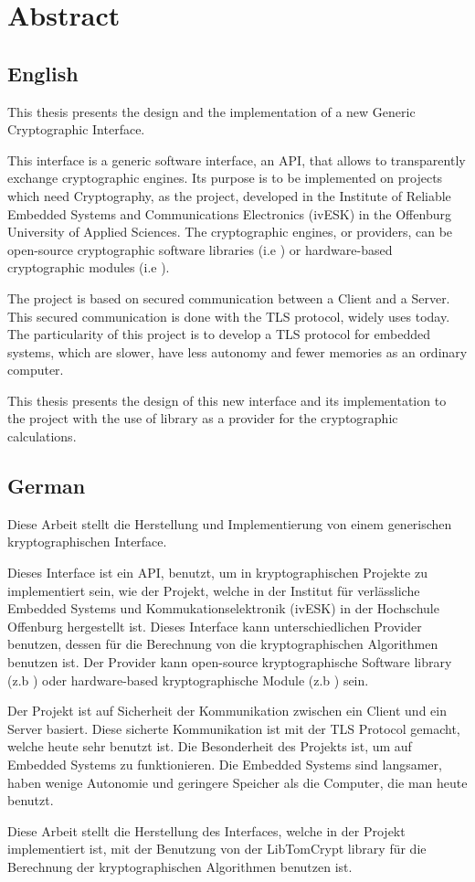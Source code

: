 \chapter*{Abstract}

\section*{English}

This thesis presents the design and the implementation of a new Generic
Cryptographic Interface.

This interface is a generic software interface, an API, that allows
to transparently exchange cryptographic engines. Its purpose is to be
implemented on projects which need Cryptography, as the \embtls project,
developed in the Institute of Reliable Embedded Systems and Communications
Electronics (ivESK) in the Offenburg University of Applied Sciences.
The cryptographic engines, or providers, can be open-source cryptographic
software libraries (i.e \tomcrypt \cite{doc:tomcrypt}) or hardware-based
cryptographic modules (i.e \vaultic \cite{doc:vault}).

The \embtls project is based on secured communication between a Client and a
Server. This secured communication is done with the TLS protocol, widely uses
today. The particularity of this project is to develop a TLS protocol for
embedded systems, which are slower, have less autonomy and fewer memories as
an ordinary computer.

This thesis presents the design of this new interface and its implementation to
the \embtls project with the use of \tomcrypt library as a provider for the cryptographic calculations.

\section*{German}
Diese Arbeit stellt die Herstellung und Implementierung von einem generischen kryptographischen
Interface.

Dieses Interface ist ein API, benutzt, um in kryptographischen Projekte zu implementiert sein, wie
der \embtls Projekt, welche in der Institut f\"{u}r verl\"{a}ssliche Embedded
Systems und Kommukationselektronik (ivESK) in der Hochschule
Offenburg hergestellt ist.
Dieses Interface kann unterschiedlichen Provider benutzen, dessen f\"{u}r die Berechnung von die
kryptographischen Algorithmen benutzen ist. Der Provider kann open-source
kryptographische Software library (z.b \tomcrypt \cite{doc:tomcrypt}) oder
hardware-based kryptographische Module (z.b \vaultic \cite{doc:vault}) sein.

Der \embtls Projekt ist auf Sicherheit der Kommunikation zwischen ein Client und
ein Server basiert. Diese sicherte Kommunikation ist mit der TLS Protocol
gemacht, welche heute sehr benutzt ist. Die Besonderheit des \embtls Projekts
ist, um auf Embedded Systems zu funktionieren. Die Embedded Systems sind
langsamer, haben wenige Autonomie und geringere Speicher als die Computer, die man heute benutzt.

Diese Arbeit stellt die Herstellung des Interfaces, welche in der \embtls Projekt
implementiert ist, mit der Benutzung von der LibTomCrypt library f\"{u}r die
Berechnung der kryptographischen Algorithmen benutzen ist.
